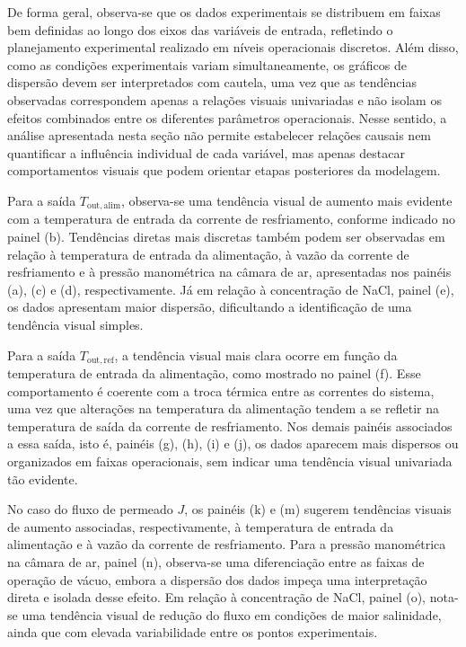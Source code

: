 De forma geral, observa-se que os dados experimentais se distribuem em faixas bem definidas ao longo dos eixos das variáveis de entrada, refletindo o planejamento experimental realizado em níveis operacionais discretos. Além disso, como as condições experimentais variam simultaneamente, os gráficos de dispersão devem ser interpretados com cautela, uma vez que as tendências observadas correspondem apenas a relações visuais univariadas e não isolam os efeitos combinados entre os diferentes parâmetros operacionais. Nesse sentido, a análise apresentada nesta seção não permite estabelecer relações causais nem quantificar a influência individual de cada variável, mas apenas destacar comportamentos visuais que podem orientar etapas posteriores da modelagem.

Para a saída \(T_{\mathrm{out,alim}}\), observa-se uma tendência visual de aumento mais evidente com a temperatura de entrada da corrente de resfriamento, conforme indicado no painel (b). Tendências diretas mais discretas também podem ser observadas em relação à temperatura de entrada da alimentação, à vazão da corrente de resfriamento e à pressão manométrica na câmara de ar, apresentadas nos painéis (a), (c) e (d), respectivamente. Já em relação à concentração de NaCl, painel (e), os dados apresentam maior dispersão, dificultando a identificação de uma tendência visual simples.

Para a saída \(T_{\mathrm{out,ref}}\), a tendência visual mais clara ocorre em função da temperatura de entrada da alimentação, como mostrado no painel (f). Esse comportamento é coerente com a troca térmica entre as correntes do sistema, uma vez que alterações na temperatura da alimentação tendem a se refletir na temperatura de saída da corrente de resfriamento. Nos demais painéis associados a essa saída, isto é, painéis (g), (h), (i) e (j), os dados aparecem mais dispersos ou organizados em faixas operacionais, sem indicar uma tendência visual univariada tão evidente.

No caso do fluxo de permeado \(J\), os painéis (k) e (m) sugerem tendências visuais de aumento associadas, respectivamente, à temperatura de entrada da alimentação e à vazão da corrente de resfriamento. Para a pressão manométrica na câmara de ar, painel (n), observa-se uma diferenciação entre as faixas de operação de vácuo, embora a dispersão dos dados impeça uma interpretação direta e isolada desse efeito. Em relação à concentração de NaCl, painel (o), nota-se uma tendência visual de redução do fluxo em condições de maior salinidade, ainda que com elevada variabilidade entre os pontos experimentais.

